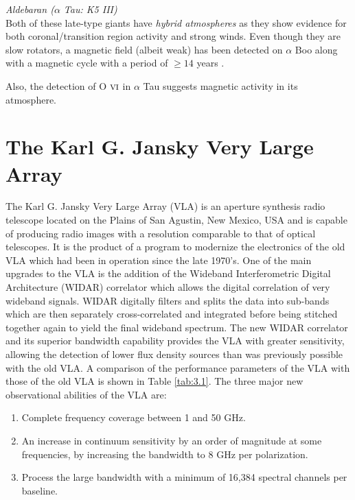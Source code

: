 \textit{Aldebaran ($\alpha$ Tau: K5 III)}\\
Both of these late-type giants have \textit{hybrid atmospheres} as they show evidence for both coronal/transition region activity and strong winds. Even though they are slow rotators, a magnetic field (albeit weak) has been detected on $\alpha$ Boo \citep{sennhauser_2011} along with a magnetic cycle with a period of $\geq 14$ years \citep{brown_2008}. 

Also, the detection of O $\textsc{vi}$ in $\alpha$ Tau \citep{dupree_2005} suggests magnetic activity in its atmosphere.
\section{The Karl G. Jansky Very Large Array}\label{sec:3.5}
The Karl G. Jansky Very Large Array (VLA) is an aperture synthesis radio telescope located on the Plains of San Agustin, New Mexico, USA and is capable of producing radio images with a resolution comparable to that of optical telescopes. It is the product of a program to modernize the electronics of the old VLA which had been in operation since the late 1970's. One of the main upgrades to the VLA is the addition of the Wideband Interferometric Digital Architecture (WIDAR) correlator which allows the digital correlation of very wideband signals. WIDAR digitally filters and splits the data into sub-bands which are then separately cross-correlated and integrated before being stitched together again to yield the final wideband spectrum. The new WIDAR correlator and its superior bandwidth capability provides the VLA with greater sensitivity, allowing the detection of lower flux density sources than was previously possible with the old VLA. A comparison of the performance parameters of the VLA with those of the old VLA is shown in Table \ref{tab:3.1}. The three major new observational abilities of the VLA are:
\begin{enumerate}
\item Complete frequency coverage between 1 and 50 GHz.
\item An increase in continuum sensitivity by an order of magnitude at some frequencies, by increasing the bandwidth to 8 GHz per polarization.
\item Process the large bandwidth with a minimum of 16,384 spectral channels per baseline.
\end{enumerate}

